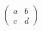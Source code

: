 \documentclass[preview]{standalone}
\begin{document}
\begin{align*}
\begin{pmatrix} a & b \\ c & d \end{pmatrix}
\end{align*}
\end{document}
